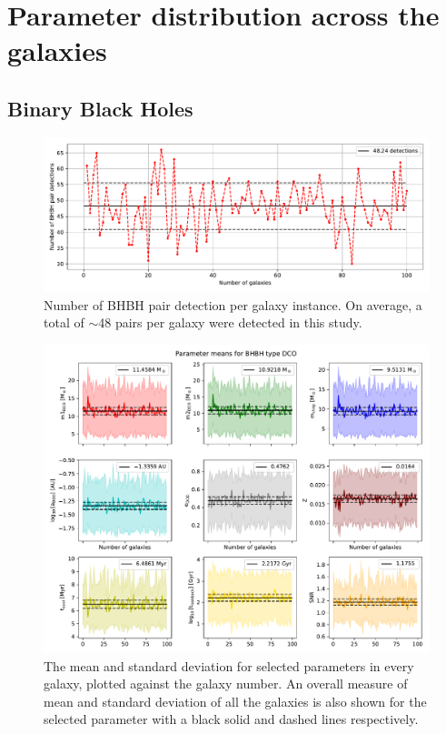 \section{Parameter distribution across the galaxies}
\label{sec:paramter-distribution-across-the-galaxies}
\subsection{Binary Black Holes}
\begin{figure}[!h]
    \centering
    \includegraphics[width=\columnwidth]{analysis_data/main_analysis_folder/BHBH_n_detections}
    \caption{Number of BHBH pair detection per galaxy instance. On average, a total of $\sim$48 pairs per galaxy were detected in this study.}
    \label{fig:bhbhndetections}
\end{figure}

\begin{figure}[!h]
    \centering
    \includegraphics[width=\columnwidth]{analysis_data/main_analysis_folder/BHBH_n_galaxy_mean_plot}
    \caption{The mean and standard deviation for selected parameters in every galaxy, plotted against the galaxy number. An overall measure of mean and standard deviation of all the galaxies is also shown for the selected parameter with a black solid and dashed lines respectively.}
    \label{fig:bhbh_n_galaxy_mean_plot}
\end{figure}

